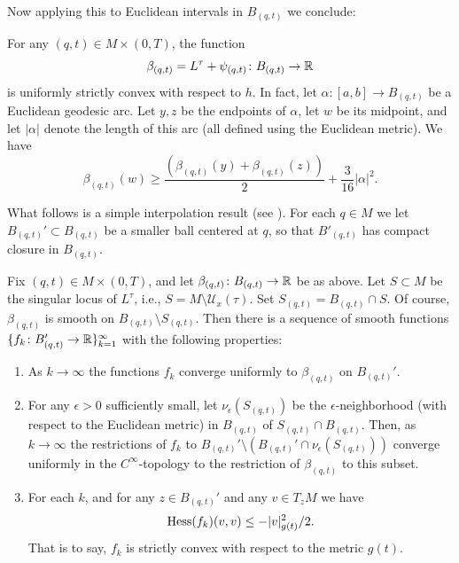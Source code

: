 Now applying this to Euclidean intervals in $B_{(q,t)}$ we conclude:

\begin{corollary}
\label{cor:l-tau-uniform-convexity}\label{lineineq}

For any $(q,t)\in M\times (0,T)$, the function
$$\beta_{(q,t)}=L^\tau+\psi_{(q,t)}\colon B_{(q,t)}\to\mathbb{R}$$ is
uniformly strictly convex with respect to $h$. In fact, let
$\alpha\colon [a,b]\to B_{(q,t)}$ be a Euclidean geodesic arc. Let
$y,z$ be the endpoints of $\alpha$, let $w$ be its midpoint, and let
$|\alpha|$ denote the length of this arc (all defined using the
Euclidean metric). We have
$$\beta_{(q,t)}(w)\ge \frac{\left(\beta_{(q,t)}(y)+\beta_{(q,t)}(z)\right)}{2}+\frac{3}{16}|\alpha|^2.$$
\end{corollary}

What follows is a simple interpolation result (see \cite{GreeneWu}).
For each $q\in M$ we let $B_{(q,t)}'\subset B_{(q,t)}$ be a smaller
ball centered at $q$, so that $B'_{(q,t)}$ has compact closure in
$B_{(q,t)}$.



\begin{claim}
\label{claim:smooth-convex-approximation}

Fix $(q,t)\in M\times(0,T)$, and let $\beta_{(q,t)}\colon B_{(q,t)}\to \mathbb{R}$ be
as above. Let $S\subset M$ be the singular locus of $L^\tau$, i.e.,
$S=M\setminus {\mathcal U}_{x}(\tau)$. Set $S_{(q,t)}=B_{(q,t)}\cap S$. Of
course, $\beta_{(q,t)}$ is smooth on $B_{(q,t)}\setminus S_{(q,t)}$. Then there
is a sequence of smooth functions $\{f_k\colon B'_{(q,t)}\to
\mathbb{R}\}_{k=1}^\infty$ with the following properties:
\begin{enumerate}
\item As $k\rightarrow \infty$ the functions $f_k$ converge uniformly to $\beta_{(q,t)}$ on
$B_{(q,t)}'$.
\item For any $\epsilon>0$ sufficiently small, let $\nu_\epsilon(S_{(q,t)})$ be the
$\epsilon$-neighborhood (with respect to the Euclidean metric) in
$B_{(q,t)}$ of $S_{(q,t)}\cap B_{(q,t)}$. Then, as $k\rightarrow
\infty$ the restrictions of $f_k$ to $B_{(q,t)}'\setminus
\left(B_{(q,t)}'\cap \nu_\epsilon(S_{(q,t)})\right)$ converge
uniformly in the $C^\infty$-topology to the restriction of
$\beta_{(q,t)}$ to this subset.
\item For each $k$, and for any $z\in B_{(q,t)}'$ and any $v\in T_zM$ we have
$$\operatorname{Hess}(f_k)(v,v)\le -|v|_{g(t)}^2/2.$$
That is to say, $f_k$ is strictly convex with respect to the metric
$g(t)$.
\end{enumerate}
\end{claim}

